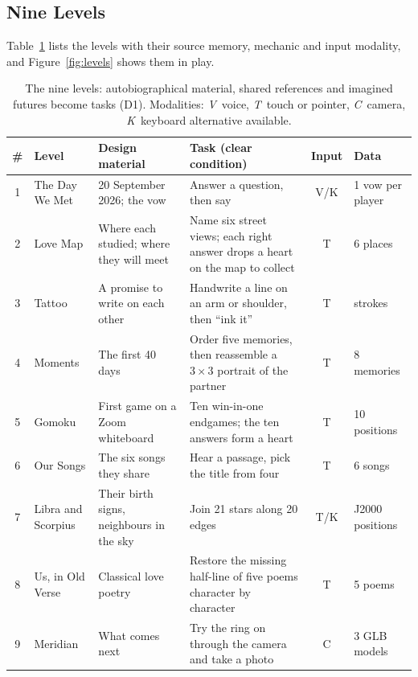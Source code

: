 \documentclass[sigconf,nonacm]{acmart}
\newcommand{\zh}[1]{\begingroup\normalfont\begin{CJK*}{UTF8}{gbsn}#1\end{CJK*}\endgroup}
\newcommand{\dc}[1]{\textsc{D#1}}
\begin{document}
\subsection{Nine Levels}
Table~\ref{tab:levels} lists the levels with their source memory, mechanic and input modality,
and Figure~\ref{fig:levels} shows them in play.

\begin{table}[t]
  \caption{The nine levels: autobiographical material, shared references and imagined futures become tasks (\dc{1}). Modalities: \emph{V}~voice,
  \emph{T}~touch or pointer, \emph{C}~camera, \emph{K}~keyboard alternative available.}
  \label{tab:levels}
  \small
  \begin{tabular}{@{}clp{}p{}cl@{}}
    \toprule
    \# & Level & Design material & Task (clear condition) & Input & Data \\
    \midrule
    1 & The Day We Met & 20 September 2026; the vow & Answer a question, then say \emph{\zh{我爱你，<name>，我愿意}} aloud; homophones of the name accepted & V/K & 1 vow per player \\
    2 & Love Map & Where each studied; where they will meet & Name six street views; each right answer drops a heart on the map to collect & T & 6 places \\
    3 & Tattoo & A promise to write on each other & Handwrite a line on an arm or shoulder, then ``ink it'' & T & strokes \\
    4 & Moments & The first 40 days & Order five memories, then reassemble a $3\times3$ portrait of the partner & T & 8 memories \\
    5 & Gomoku & First game on a Zoom whiteboard & Ten win-in-one endgames; the ten answers form a heart & T & 10 positions \\
    6 & Our Songs & The six songs they share & Hear a passage, pick the title from four & T & 6 songs \\
    7 & Libra and Scorpius & Their birth signs, neighbours in the sky & Join 21 stars along 20 edges & T/K & J2000 positions \\
    8 & Us, in Old Verse & Classical love poetry & Restore the missing half-line of five poems character by character & T & 5 poems \\
    9 & Meridian & What comes next & Try the ring on through the camera and take a photo & C & 3 GLB models \\
    \bottomrule
  \end{tabular}
\end{table}
\end{document}
